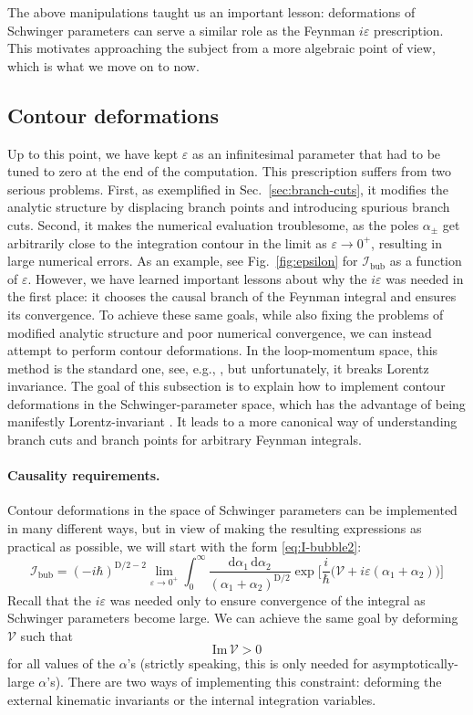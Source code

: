 \documentclass[12pt]{article}
\numberwithin{figure}{section}
\def \be {\begin{equation}}
\def \ee {\end{equation}}
\def \D {\mathrm{D}}
\def \d {\mathrm{d}}
\def \eps {\varepsilon}
\def \V {\mathcal{V}}
\def \I {\mathcal{I}}
\def \Im {\mathrm{Im}}
\def \bubble {\mathrm{bub}}
\begin{document}
	The above manipulations taught us an important lesson: deformations of Schwinger parameters can serve a similar role as the Feynman $i\eps$ prescription. This motivates approaching the subject from a more algebraic point of view, which is what we move on to now.
	
	\subsection{\label{sec:deformations}Contour deformations}
	
	Up to this point, we have kept $\eps$ as an infinitesimal parameter that had to be tuned to zero at the end of the computation. This prescription suffers from two serious problems. First, as exemplified in Sec.~\ref{sec:branch-cuts}, it modifies the analytic structure by displacing branch points and introducing spurious branch cuts. Second, it makes the numerical evaluation troublesome, as the poles $\alpha_\pm$ get arbitrarily close to the integration contour in the limit as $\eps \to 0^+$, resulting in large numerical errors. As an example, see Fig.~\ref{fig:epsilon} for $\I_\bubble$ as a function of $\eps$. However, we have learned important lessons about why the $i\eps$ was needed in the first place: it chooses the causal branch of the Feynman integral and ensures its convergence. To achieve these same goals, while also fixing the problems of modified analytic structure and poor numerical convergence, we can instead attempt to perform contour deformations. In the loop-momentum space, this method is the standard one, see, e.g., \cite{Itzykson:1980rh}, but unfortunately, it breaks Lorentz invariance. The goal of this subsection is to explain how to implement contour deformations in the Schwinger-parameter space, which has the advantage of being manifestly Lorentz-invariant \cite{Mizera:2021fap}. It leads to a more canonical way of understanding branch cuts and branch points for arbitrary Feynman integrals.
	
	\paragraph{Causality requirements.}
	Contour deformations in the space of Schwinger parameters can be implemented in many different ways, but
	in view of making
	the resulting expressions as practical as possible, we will start with the form \eqref{eq:I-bubble2}:
	\be
	\label{eq:I-bubble-contour}
	\I_\bubble = \left(-i \hbar \right)^{\D/2-2} \lim_{\eps \to 0^+} \int_0^\infty \frac{\d\alpha_1\, \d\alpha_2}{(\alpha_1 {+} \alpha_2)^{\D/2}} \exp \bigg[ \frac{i}{\hbar} \bigg( \V + i\eps (\alpha_1 {+} \alpha_2) \bigg) \bigg]
	\ee
	Recall that the $i\eps$ was needed only to ensure convergence of the integral as Schwinger parameters become large. We can achieve the same goal by deforming $\V$ such that
	\be\label{eq:ImV}
	\Im\, \V > 0
	\ee
	for all values of the $\alpha$'s (strictly speaking, this is only needed for asymptotically-large $\alpha$'s). There are
	two ways of implementing this constraint: deforming the external kinematic invariants or the internal integration variables.
	
\end{document}
